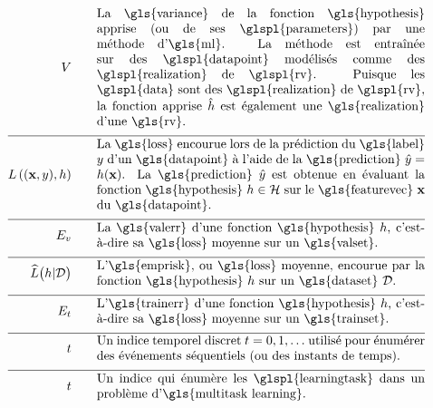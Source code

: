 \begin{align}
	\varianceterm \quad\quad &\parbox{.75\textwidth}{La \gls{variance} de la fonction \gls{hypothesis} apprise (ou de ses \glspl{parameters}) par une méthode d’\gls{ml}. La méthode est entraînée sur des \glspl{datapoint} modélisés comme des \glspl{realization} de \glspl{rv}. Puisque les \glspl{data} sont des \glspl{realization} de \glspl{rv}, la fonction apprise $\learnthypothesis$ est également une \gls{realization} d’une \gls{rv}.} \nonumber \\[2mm] \hline \nonumber\\[-5mm]
	\lossfunc{(\featurevec,\truelabel)}{\hypothesis}  \quad\quad & \parbox{.75\textwidth}{La \gls{loss} encourue lors de la prédiction du \gls{label} $\truelabel$ d’un \gls{datapoint} à l’aide de la \gls{prediction} $\hat{\truelabel}=h(\featurevec)$. La \gls{prediction} $\hat{\truelabel}$ est obtenue en évaluant la fonction \gls{hypothesis} $\hypothesis \in \hypospace$ sur le \gls{featurevec} $\featurevec$ du \gls{datapoint}.} \nonumber \\[2mm] \hline \nonumber\\[-5mm] 
	\valerror \quad\quad &\parbox{.75\textwidth}{La \gls{valerr} d’une fonction \gls{hypothesis} $\hypothesis$, c’est-à-dire sa \gls{loss} moyenne sur un \gls{valset}.}  \nonumber \\[2mm] \hline \nonumber\\[-5mm]
	\emperror\big(\hypothesis| \dataset \big) \quad\quad &\parbox{.75\textwidth}{L’\gls{emprisk}, ou \gls{loss} moyenne, encourue par la fonction \gls{hypothesis} $\hypothesis$ sur un \gls{dataset} $\dataset$.} \nonumber  \\[2mm] \hline \nonumber\\[-5mm]
	\trainerror \quad\quad &\parbox{.75\textwidth}{L’\gls{trainerr} d’une fonction \gls{hypothesis} $\hypothesis$, c’est-à-dire sa \gls{loss} moyenne sur un \gls{trainset}.} \nonumber \\[2mm] \hline \nonumber\\[-5mm]
	\timeidx \quad\quad &\parbox{.75\textwidth}{Un indice temporel discret $\timeidx=0,1,\ldots$ utilisé pour énumérer des événements séquentiels (ou des instants de temps).} \nonumber \\[2mm] \hline \nonumber\\[-5mm]
	\taskidx \quad\quad &\parbox{.75\textwidth}{Un indice qui énumère les \glspl{learningtask} dans un problème d’\gls{multitask learning}.} \nonumber
\end{align}

